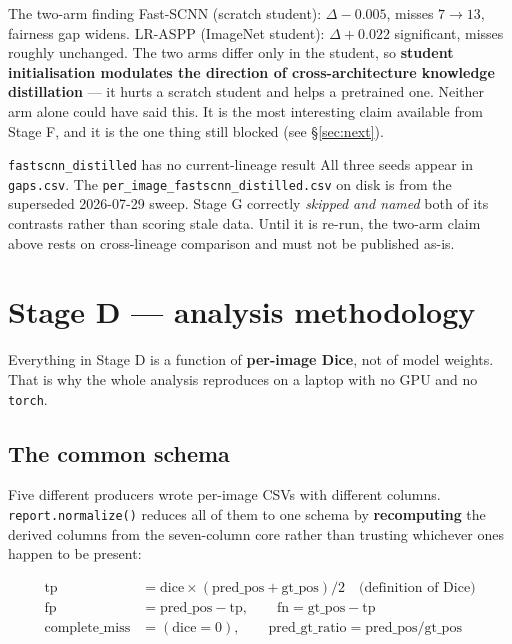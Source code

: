 \documentclass[11pt]{article}
\begin{document}
\begin{keybox}{The two-arm finding}
Fast-SCNN (scratch student): $\Delta -0.005$, misses $7\to13$, fairness gap
widens. LR-ASPP (ImageNet student): $\Delta +0.022$ significant, misses roughly
unchanged. The two arms differ only in the student, so \textbf{student
initialisation modulates the direction of cross-architecture knowledge
distillation} --- it hurts a scratch student and helps a pretrained one. Neither
arm alone could have said this. It is the most interesting claim available from
Stage F, and it is the one thing still blocked (see \S\ref{sec:next}).
\end{keybox}

\begin{warnbox}{\texttt{fastscnn\_distilled} has no current-lineage result}
All three seeds appear in \texttt{gaps.csv}. The
\texttt{per\_image\_fastscnn\_distilled.csv} on disk is from the superseded
2026-07-29 sweep. Stage G correctly \emph{skipped and named} both of its
contrasts rather than scoring stale data. Until it is re-run, the two-arm claim
above rests on cross-lineage comparison and must not be published as-is.
\end{warnbox}

\section{Stage D --- analysis methodology}

Everything in Stage D is a function of \textbf{per-image Dice}, not of model
weights. That is why the whole analysis reproduces on a laptop with no GPU and no
\texttt{torch}.

\subsection{The common schema}

Five different producers wrote per-image CSVs with different columns.
\texttt{report.normalize()} reduces all of them to one schema by
\textbf{recomputing} the derived columns from the seven-column core rather than
trusting whichever ones happen to be present:

\begin{align*}
\mathrm{tp} &= \mathrm{dice}\times(\mathrm{pred\_pos} + \mathrm{gt\_pos})/2
  \quad\text{(definition of Dice)}\\
\mathrm{fp} &= \mathrm{pred\_pos} - \mathrm{tp}, \qquad
\mathrm{fn} = \mathrm{gt\_pos} - \mathrm{tp}\\
\mathrm{complete\_miss} &= (\mathrm{dice} = 0), \qquad
\mathrm{pred\_gt\_ratio} = \mathrm{pred\_pos}/\mathrm{gt\_pos}
\end{align*}
\end{document}
